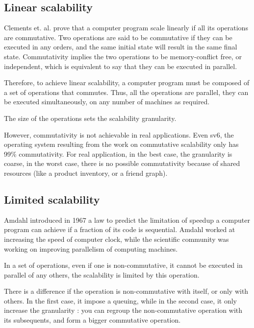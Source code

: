 \subsection{Linear scalability}

Clements et. al. \cite{Clements2013a} prove that a computer program scale linearly if all its operations are commutative.
Two operations are said to be commutative if they can be executed in any orders, and the same initial state will result in the same final state.
Commutativity implies the two operations to be memory-conflict free, or independent, which is equivalent to say that they can be executed in parallel.

Therefore, to achieve linear scalability, a computer program must be composed of a set of operations that commutes.
Thus, all the operations are parallel, they can be executed simultaneously, on any number of machines as required.

The size of the operations sets the scalability granularity.

However, commutativity is not achievable in real applications.
Even sv6, the operating system resulting from the work on commutative scalability only has 99\% commutativity.
For real application, in the best case, the granularity is coarse, in the worst case, there is no possible commutativity because of shared resources (like a product inventory, or a friend graph).


\subsection{Limited scalability}

Amdahl introduced in 1967 a law to predict the limitation of speedup a computer program can achieve if a fraction of its code is sequential.
Amdahl worked at increasing the speed of computer clock, while the scientific community was working on improving parallelism of computing machines.

In a set of operations, even if one is non-commutative, it cannot be executed in parallel of any others, the scalability is limited by this operation.

There is a difference if the operation is non-commutative with itself, or only with others.
In the first case, it impose a queuing, while in the second case, it only increase the granularity : you can regroup the non-commutative operation with its subsequents, and form a bigger commutative operation.

